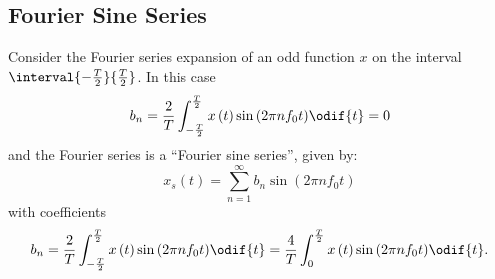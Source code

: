 \documentclass{article}
\begin{document}
\subsection{Fourier Sine Series}
Consider the Fourier series expansion of an odd function \(x\) on the
interval \(\interval{-\frac{T}{2}}{\frac{T}{2}}\). In this case
\begin{equation*}
    b_n = \frac{2}{T} \int_{-\frac{T}{2}}^{\frac{T}{2}} x\left( t \right) \sin{\left( 2\pi n f_0 t \right)} \odif{t} = 0
\end{equation*}
and the Fourier series is a ``Fourier sine series'', given by:
\begin{equation*}
    x_s\left( t \right) = \sum_{n = 1}^\infty b_n \sin{\left( 2\pi n f_0 t \right)}
\end{equation*}
with coefficients
\begin{equation*}
    b_n = \frac{2}{T} \int_{-\frac{T}{2}}^{\frac{T}{2}} x\left( t \right) \sin{\left( 2 \pi n f_0 t \right)} \odif{t} = \frac{4}{T} \int_0^{\frac{T}{2}} x\left( t \right) \sin{\left( 2\pi n f_0 t \right)} \odif{t}.
\end{equation*}
\end{document}
